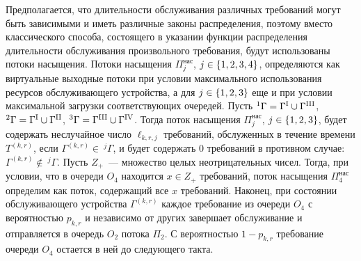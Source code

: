 \documentclass[a4paper,12pt,russian]{extarticle}
\newcommand{\G}{\Gamma}
\newcommand{\ga}[1]{\Gamma^{\left( #1 \right)} }
\newcommand{\Tt}[1]{T^{\left( #1 \right)} }
\begin{document}
Предполагается, что длительности обслуживания различных требований могут быть зависимыми и иметь различные законы распределения, поэтому вместо классического способа, состоящего в указании функции распределения длительности обслуживания произвольного требования, будут использованы потоки насыщения. Потоки насыщения $\Pi^{\mathrm{\text{нас}}}_j$, $j \in \left\{1,2,3,4\right\}$, определяются как виртуальные выходные потоки при 
условии максимального использования ресурсов обслуживающего устройства, а для $j\in \left\{1, 2, 3\right\}$ еще и при условии максимальной загрузки соответствующих очередей. Пусть ${}^1\G=\G^{\mathrm{\Rmnum{1}}} \cup \G^{\mathrm{\Rmnum{3}}}$, 
${}^2\G=\G^{\mathrm{\Rmnum{1}}} \cup \G^{\mathrm{\Rmnum{2}}}$,
${}^3\G=\G^{\mathrm{\Rmnum{3}}} \cup \G^{\mathrm{\Rmnum{4}}}$. 
Тогда поток насыщения $\Pi^{\mathrm{\text{нас}}}_j$, $j\in \left\{1,2,3\right\}$, будет содержать неслучайное число $\ell_{k,r,j}$ требований, обслуженных в течение времени $\Tt{k,r}$, если $\ga{k,r} \in~^j\G$, и будет содержать $0$ требований в противном случае: $\ga{k,r} \notin ~^j\G$. Пусть $Z_+$~--- множество целых неотрицательных чисел. Тогда, при условии, что в очереди $O_4$ находится $x \in Z_+$ требований, поток насыщения $\Pi^{\mathrm{\text{нас}}}_4$ определим как поток, содержащий все $x$ требований.
Наконец, при состоянии обслуживающего устройства $\ga{k,r}$ каждое требование из очереди $O_4$ с вероятностью $p_{k,r}$ и независимо от других завершает обслуживание и отправляется в очередь $O_2$ потока $\Pi_2$. С вероятностью $1-p_{k,r}$ требование очереди $O_4$ остается в ней до следующего такта.
\end{document}
